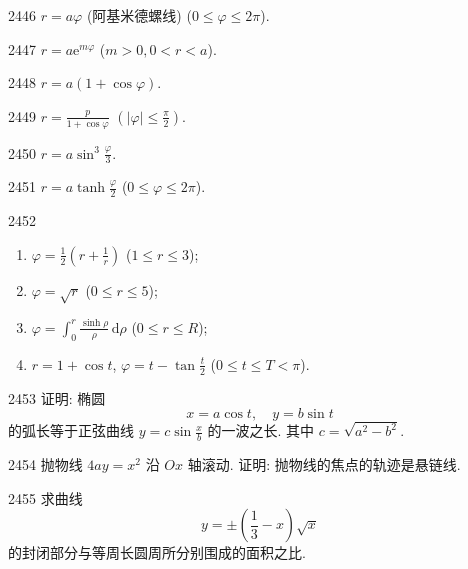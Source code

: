 \begin{prob}[S]{2446}
$r = a\varphi$ (阿基米德螺线) ($0 \leqslant \varphi \leqslant 2\pi$).
\end{prob}

\begin{prob}[S]{2447}
$r = a\mathrm{e}^{m\varphi}$ ($m > 0, 0 < r < a$).
\end{prob}

\begin{prob}[S]{2448}
$r = a(1 + \cos\varphi)$.
\end{prob}

\begin{prob}[S]{2449}
$r = \frac{p}{1 + \cos\varphi}$ $\left(|\varphi| \leqslant \frac{\pi}{2}\right)$.
\end{prob}

\begin{prob}[S]{2450}
$r = a\sin^3\frac{\varphi}{3}$.
\end{prob}

\begin{prob}[S]{2451}
$r = a\tanh\frac{\varphi}{2}$ ($0 \leqslant \varphi \leqslant 2\pi$).
\end{prob}

\begin{prob}[L]{2452}
\begin{enumerate}[label=(\alph*), itemsep=2pt, topsep=3pt]
\item $\varphi = \frac{1}{2}\left(r + \frac{1}{r}\right)$ ($1 \leqslant r \leqslant 3$);
\item $\varphi = \sqrt{r}$ ($0 \leqslant r \leqslant 5$);
\item $\varphi = \int_0^r \frac{\sinh\rho}{\rho}\,\mathrm{d}\rho$ ($0 \leqslant r \leqslant R$);
\item $r = 1 + \cos t$, $\varphi = t - \tan\frac{t}{2}$ ($0 \leqslant t \leqslant T < \pi$).
\end{enumerate}
\end{prob}

\begin{prob}[M]{2453}
证明: 椭圆
\[
x = a\cos t, \quad y = b\sin t
\]
的弧长等于正弦曲线 $y = c\sin\frac{x}{b}$ 的一波之长. 其中 $c = \sqrt{a^2 - b^2}$.
\end{prob}

\begin{prob}[M]{2454}
抛物线 $4ay = x^2$ 沿 $Ox$ 轴滚动. 证明: 抛物线的焦点的轨迹是悬链线.
\end{prob}

\begin{prob}[M]{2455}
求曲线
\[
y = \pm\left(\frac{1}{3} - x\right)\sqrt{x}
\]
的封闭部分与等周长圆周所分别围成的面积之比.
\end{prob}

